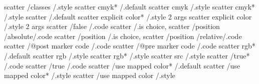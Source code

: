 scatter                /classes                    /.style
scatter cmyk*                                      /.default
scatter cmyk                                       /.style
scatter cmyk*                                      /.style
scatter                                            /.default
scatter explicit color*                            /.style 2 args
scatter explicit color                             /.style 2 args
scatter                /false                      /.code
scatter                                            /.is choice,
scatter                /position          /absolute/.code
scatter                /position                   /.is choice,
scatter                /position          /relative/.code
scatter                /@post marker code          /.code
scatter                /@pre marker code           /.code
scatter rgb*                                       /.default
scatter rgb                                        /.style
scatter rgb*                                       /.style
scatter src                                        /.style
scatter                /true*                      /.code
scatter                /true                       /.code
scatter                /use mapped color*          /.default
scatter                /use mapped color*          /.style
scatter                /use mapped color           /.style


